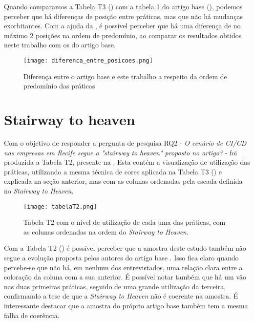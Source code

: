 Quando comparamos a Tabela T3 () com a tabela 1 do artigo base (), podemos perceber que há diferenças de posição entre práticas, mas que não há mudanças exorbitantes. Com a ajuda da , é possível perceber que há uma diferença de no máximo 2 posições na ordem de predomínio, ao comparar os resultados obtidos neste trabalho com os do artigo base. 

\begin{figure}[ht]
\begin{center}
\texttt{[image: diferenca\_entre\_posicoes.png]}
\end{center}
\caption[Diferença entre a ordem de predomínio das práticas]{
    Diferença entre o artigo base e este trabalho a respeito da ordem de predomínio das práticas
}\label{diferenca_entre_posicoes_fig}
\end{figure}

\section{Stairway to heaven}

Com o objetivo de responder a pergunta de pesquisa RQ2 - \emph{ O cenário de CI/CD nas empresas em Recife segue o "stairway to heaven" proposto no artigo?} - foi produzida a Tabela T2, presente na . Esta contém a visualização de utilização das práticas, utilizando a mesma técnica de cores aplicada na Tabela T3 ()  e explicada na seção anterior, mas com as colunas ordenadas pela escada definida no \emph{Stairway to Heaven}.

\begin{figure}[ht]
\begin{center}
\texttt{[image: tabelaT2.png]}
\end{center}
\caption[Tabela T2]{
    Tabela T2 com o nível de utilização de cada uma das práticas, com as colunas ordenadas na ordem do \emph{Stairway to Heaven}.
}\label{tabela_t2}
\end{figure}

Com a Tabela T2 () é possível perceber que a amostra deste estudo também não segue a evolução proposta pelos autores do artigo base \cite{empiricalStudy2016}. Isso fica claro quando percebe-se que não há, em nenhum dos entrevistados, uma relação clara entre a coloração da coluna com a sua anterior. É possível notar também que há um vão nas duas primeiras práticas, seguido de uma grande utilização da terceira, confirmando a tese de que a \emph{Stairway to Heaven} não é coerente na amostra. É interessante destacar que a amostra do próprio artigo base também tem a mesma falha de coerência.

